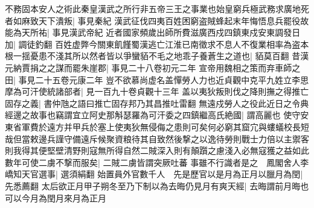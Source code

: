 不務固本安人之術此秦皇漢武之所行非五帝三王之事業也始皇窮兵極武務求廣地死者如麻致天下潰叛|{
	事見秦紀}
漢武征伐四夷百姓困窮盗賊蜂起末年悔悟息兵罷役故能為天所祐|{
	事見漢武帝紀}
近者國家頻歲出師所費滋廣西戍四鎮東戍安東調發日加|{
	調徒釣翻}
百姓虚弊今關東飢饉蜀漢逃亡江淮已南徵求不息人不復業相率為盗本根一揺憂患不淺其所以然者皆以爭蠻貊不毛之地乖子養蒼生之道也|{
	貊莫百翻}
昔漢元納賈捐之之謀而罷朱崖郡|{
	事見二十八卷初元二年}
宣帝用魏相之策而弃車師之田|{
	事見二十五卷元康二年}
豈不欲慕尚虚名盖憚勞人力也近貞觀中克平九姓立李思摩為可汗使統諸部者|{
	見一百九十卷貞觀十三年}
盖以夷狄叛則伐之降則撫之得推亡固存之義|{
	書仲虺之語曰推亡固存邦乃其昌推吐雷翻}
無遠戍勞人之役此近日之令典經邊之故事也竊謂宜立阿史那斛瑟羅為可汗委之四鎮繼高氏絶國|{
	謂高麗也}
使守安東省軍費於遠方并甲兵於塞上使夷狄無侵侮之患則可矣何必窮其窟宂與螻蟻校長短哉但當敕邊兵謹守備遠斥候聚資粮待其自致然後撃之以逸待勞則戰士力倍以主禦客則我得其便堅壁清野則寇無所得自然二賊深入則有顛躓之慮淺入必無寇獲之益如此數年可使二虜不撃而服矣|{
	二賊二虜皆謂突厥吐蕃}
事雖不行識者是之　鳳閣舍人李嶠知天官選事|{
	選須絹翻}
始置員外官數千人　先是歷官以是月為正月以臘月為閏|{
	先悉薦翻}
太后欲正月甲子朔冬至乃下制以為去晦仍見月有爽天經|{
	去晦謂前月晦也}
可以今月為閏月來月為正月

